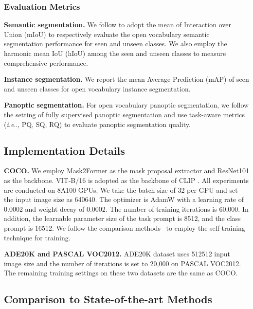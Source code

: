 \documentclass[10pt,twocolumn,letterpaper]{article}
\makeatletter
\DeclareRobustCommand\onedot{\futurelet\@let@token\@onedot}
\def\@onedot{\ifx\@let@token.\else.\null\fi\xspace}
\def\ie{\emph{i.e}\onedot} \def\Ie{\emph{I.e}\onedot}
\makeatother
\begin{document}
\subsubsection{Evaluation Metrics}
\textbf{Semantic segmentation.}
We follow \cite{ding2022decoupling, xu2021simple} to adopt the mean of Interaction over Union (mIoU) to respectively evaluate the open vocabulary semantic segmentation performance for seen and unseen classes. We also employ the harmonic mean IoU (hIoU) among the seen and unseen classes to measure comprehensive performance. 

\noindent \textbf{Instance segmentation.}
We report the mean Average Prediction (mAP) of seen and unseen classes for open vocabulary instance segmentation. 


\noindent \textbf{Panoptic segmentation.}
For open vocabulary panoptic segmentation, we follow the setting of fully supervised panoptic segmentation and use task-aware metrics (\ie, PQ, SQ, RQ) to evaluate panoptic segmentation quality.



\subsection{Implementation Details}

\noindent \textbf{COCO.}
We employ Mask2Former\cite{cheng2022masked} as the mask proposal extractor and ResNet101 as the backbone. VIT-B/16 is adopted as the backbone of CLIP \cite{radford2021learning}.  All experiments are conducted on 8A100 GPUs. 
We take the batch size of 32 per GPU and set the input image size as 640640. 
The optimizer is AdamW with a learning rate of 0.0002 and weight decay of 0.0002. The number of training iterations is 60,000. 
In addition, the learnable parameter size of the task prompt is 8512, and the class prompt is 16512. 
We follow the comparison methods~\cite{pastore2021closer,ding2022decoupling,xu2021simple} to employ the self-training technique for training.

\noindent \textbf{ADE20K and PASCAL VOC2012.}
ADE20K dataset uses  512512 input image size and the number of iterations is set to 20,000 on PASCAL VOC2012. The remaining training settings on these two datasets are the same as COCO.


\subsection{Comparison to State-of-the-art Methods}
\end{document}
